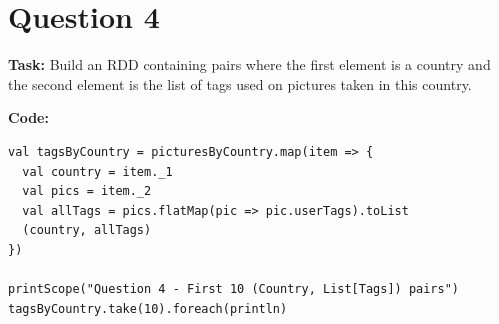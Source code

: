 \documentclass[11pt]{article}
\begin{document}
\section*{Question 4}
\textbf{Task:} Build an RDD containing pairs where the first element is a country and the second element is the list of tags used on pictures taken in this country.

\textbf{Code:}
\begin{lstlisting}
val tagsByCountry = picturesByCountry.map(item => {
  val country = item._1
  val pics = item._2
  val allTags = pics.flatMap(pic => pic.userTags).toList
  (country, allTags)
})

printScope("Question 4 - First 10 (Country, List[Tags]) pairs")
tagsByCountry.take(10).foreach(println)
\end{lstlisting}
\end{document}
